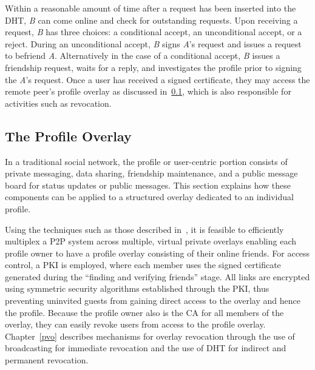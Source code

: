 Within a reasonable amount of time after a request has been inserted into the
DHT, \textit{B} can come online and check for outstanding requests.  Upon
receiving a request, \textit{B} has three choices: a conditional accept, an
unconditional accept, or a reject.  During an unconditional accept, \textit{B}
signs \textit{A}'s request and issues a request to befriend \textit{A}.
Alternatively in the case of a conditional accept, \textit{B} issues a friendship
request, waits for a reply, and investigates the profile prior to signing the
\textit{A}'s request.  Once a user has received a signed certificate,
they may access the remote peer's profile overlay as discussed
in~\ref{profile_overlay}, which is also responsible for activities such as
revocation.


\subsection{The Profile Overlay}
\label{profile_overlay}
In a traditional social network, the profile or user-centric portion consists
of private messaging, data sharing, friendship maintenance, and a public
message board for status updates or public messages.  This section explains how
these components can be applied to a structured overlay dedicated to an
individual profile.

Using the techniques such as those described in~\cite{icdcs10}, it is feasible
to efficiently multiplex a P2P system across multiple, virtual private overlays enabling
each profile owner to have a profile overlay consisting of their online friends.
For access control, a PKI is employed, where each member uses the signed certificate
generated during the ``finding and verifying friends'' stage.  All links are
encrypted using symmetric security algorithms established through the PKI,
thus preventing uninvited guests from gaining direct access to the overlay and
hence the profile.  Because the profile owner also is the CA for all members of
the overlay, they can easily revoke users from access to the profile overlay.
Chapter~\ref{pvo} describes mechanisms for overlay revocation through the
use of broadcasting for immediate revocation and the use of DHT for indirect
and permanent revocation.

